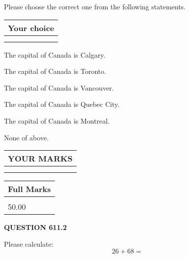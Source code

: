 \documentclass[12pt]{article}
\begin{document}
  
Please choose the correct one from the following statements.
  
  
\noindent\hspace{3.0in} \begin{tabular}{|l|}
\hline
Your choice \\
\hline
 \\ 
 \\ 
\hline
\end{tabular}
  
  
 
 
The capital of Canada is Calgary.
 
 
The capital of Canada is Toronto.
 
 
The capital of Canada is Vancouver.
 
 
The capital of Canada is Quebec City.
 
 
The capital of Canada is Montreal.
 
 
 None of above.
 
 
  
\vspace{0.2in}
  
\noindent\begin{tabular}{|l|}
\hline
 YOUR MARKS  \\
\hline
 \\ 
 \\ 
\hline
\end{tabular}
\hspace{0.05in} \begin{tabular}{|l|}
\hline
 Full Marks  \\
\hline
 \\ 
50.00 \\
\hline
\end{tabular}
{\textbf{\Large{QUESTION
611.2 
}}}
  
  
 
Please calculate:
\begin{equation}
26 +  %
68 = \nonumber
\end{equation}
 

 

 
   
   
 \vspace{0.2in}
 
   
   
   
   
\end{document}

